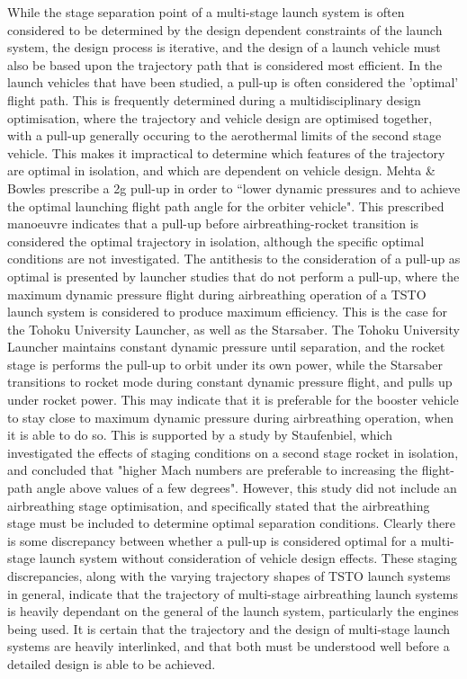 While the stage separation point of a multi-stage launch system is often considered to be determined by the design dependent constraints of the launch system, the design process is iterative, and the design of a launch vehicle must also be based upon the trajectory path that is considered most efficient.
In the launch vehicles that have been studied, a pull-up is often considered the 'optimal' flight path. This is frequently determined during a multidisciplinary design optimisation, where the trajectory and vehicle design are optimised together, with a pull-up generally occuring to the aerothermal limits of the second stage vehicle. This makes it impractical to determine which features of the trajectory are optimal in isolation, and which are dependent on vehicle design. 
Mehta \& Bowles\cite{Mehta2001} prescribe a 2g pull-up in order to ``lower dynamic pressures and to achieve the optimal launching flight path angle for the orbiter vehicle". This prescribed manoeuvre indicates that a pull-up before airbreathing-rocket transition is considered the optimal trajectory in isolation, although the specific optimal conditions are not investigated. 
The antithesis to the consideration of a pull-up as optimal is presented by launcher studies that do not perform a pull-up, where the maximum dynamic pressure flight during airbreathing operation of a TSTO launch system is considered to produce maximum efficiency. 
 This is the case for the Tohoku University Launcher, as well as the Starsaber. The Tohoku University Launcher maintains constant dynamic pressure until separation, and the rocket stage is performs the pull-up to orbit under its own power, while the Starsaber transitions to rocket mode during constant dynamic pressure flight, and pulls up under rocket power. This may indicate that it is preferable for the booster vehicle to stay close to maximum dynamic pressure during airbreathing operation, when it is able to do so. This is supported by a study by Staufenbiel\cite{Staufenbiel2000}, which investigated the effects of staging conditions on a second stage rocket in isolation, and concluded that "higher Mach numbers are preferable to increasing the flight-path angle above values of a few degrees". However, this study did not include an airbreathing stage optimisation, and specifically stated that the airbreathing stage must be included to determine optimal separation conditions\cite{Staufenbiel2000}. 
Clearly there is some discrepancy between whether a pull-up is considered optimal for a multi-stage launch system without consideration of vehicle design effects. 
These staging discrepancies, along with the varying trajectory shapes of TSTO launch systems in general, indicate that the trajectory of multi-stage airbreathing launch systems is heavily dependant on the general of the launch system, particularly the engines being used. It is certain that the trajectory and the design of multi-stage launch systems are heavily interlinked, and that both must be understood well before a detailed design is able to be achieved. 


